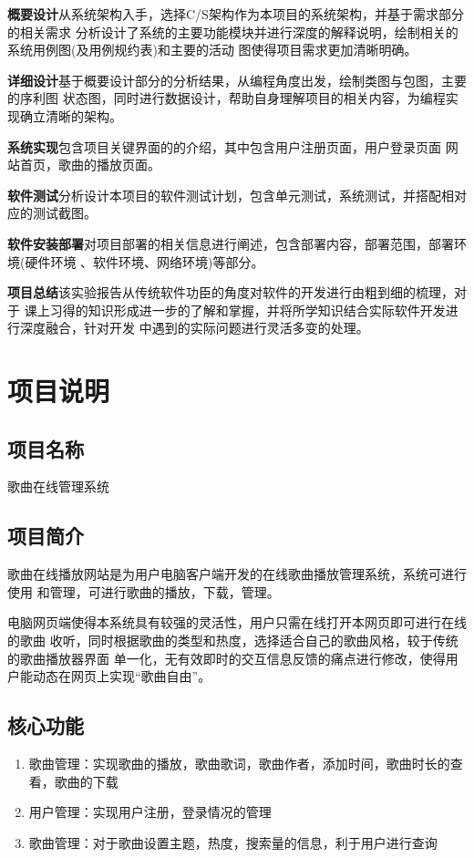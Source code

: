 \documentclass[UTF8,14pt]{article}
\numberwithin{figure}{subsubsection}
\numberwithin{table}{subsubsection}
\begin{document}
{\bfseries{概要设计}}从系统架构入手，选择C/S架构作为本项目的系统架构，并基于需求部分的相关需求
分析设计了系统的主要功能模块并进行深度的解释说明，绘制相关的系统用例图(及用例规约表)和主要的活动
图使得项目需求更加清晰明确。

{\bfseries{详细设计}}基于概要设计部分的分析结果，从编程角度出发，绘制类图与包图，主要的序利图
状态图，同时进行数据设计，帮助自身理解项目的相关内容，为编程实现确立清晰的架构。

{\bfseries{系统实现}}包含项目关键界面的的介绍，其中包含用户注册页面，用户登录页面
网站首页，歌曲的播放页面。

{\bfseries{软件测试}}分析设计本项目的软件测试计划，包含单元测试，系统测试，并搭配相对应的测试截图。

{\bfseries{软件安装部署}}对项目部署的相关信息进行阐述，包含部署内容，部署范围，部署环境(硬件环境
、软件环境、网络环境)等部分。

{\bfseries{项目总结}}该实验报告从传统软件功臣的角度对软件的开发进行由粗到细的梳理，对于
课上习得的知识形成进一步的了解和掌握，并将所学知识结合实际软件开发进行深度融合，针对开发
中遇到的实际问题进行灵活多变的处理。

\tableofcontents
\clearpage


\clearpage
\section{项目说明}
\subsection{项目名称}
歌曲在线管理系统
\subsection{项目简介}
歌曲在线播放网站是为用户电脑客户端开发的在线歌曲播放管理系统，系统可进行使用
和管理，可进行歌曲的播放，下载，管理。

电脑网页端使得本系统具有较强的灵活性，用户只需在线打开本网页即可进行在线的歌曲
收听，同时根据歌曲的类型和热度，选择适合自己的歌曲风格，较于传统的歌曲播放器界面
单一化，无有效即时的交互信息反馈的痛点进行修改，使得用户能动态在网页上实现“歌曲自由”。
\subsection{核心功能}
\begin{enumerate}
	\setlength{\itemsep}{0pt}
	      \setlength{\parsep}{0pt}
	      \setlength{\parskip}{0pt}
	\item 歌曲管理：实现歌曲的播放，歌曲歌词，歌曲作者，添加时间，歌曲时长的查看，歌曲的下载
	\item 用户管理：实现用户注册，登录情况的管理
	\item 歌曲管理：对于歌曲设置主题，热度，搜索量的信息，利于用户进行查询
\end{enumerate}
\vspace*{-0.5cm}
\end{document}
